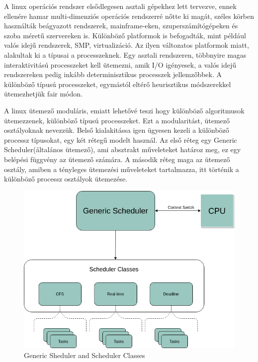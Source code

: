 
A linux operációs rendszer elsődlegesen asztali gépekhez lett tervezve, ennek ellenére hamar multi-dimenziós operációs rendszerré nőtte ki magát, széles körben használták beágyazott rendszerek, mainframe-eken, szuperszámítógépeken és szoba méretű szervereken is. Különböző platformok is befogadták, mint például valós idejű rendszerek, SMP, virtualizáció. Az ilyen változatos platformok miatt, alakultak ki a típusai a processzeknek. Egy asztali rendszeren, többnyire magas interaktivitású processzeket kell ütemezni, amik I/O igényesek, a valós idejű rendszereken pedig inkább  determinisztikus processzek jellemzőbbek. A különböző típusú processzeket, egymástól eltérő heurisztikus módszerekkel ütemezhetjük fair módon.

A linux ütemező moduláris, emiatt lehetővé teszi hogy különböző algoritmusok ütemezzenek, különböző típusú processzeket. Ezt a modularitást, ütemező osztályoknak nevezzük. Belső kialakitássa igen ügyesen kezeli a különböző processz típusokat, egy két rétegű modelt használ. Az első réteg egy Generic Scheduler(általános ütemező), ami absztrakt műveleteket határoz meg, ez egy belépési függvény az ütemező számára. A második réteg maga az ütemező osztály, amiben a tényleges ütemezési műveleteket tartalmazza, itt történik a különböző  processz osztályok ütemezése.

\begin{figure}[h]
\centering
\includegraphics[scale=0.4]{images/genericScheduler.png}
\caption{Generic Sheduler and Scheduler Classes}
\label{fig:Generic Sheduler and Scheduler Classes}
\end{figure}


